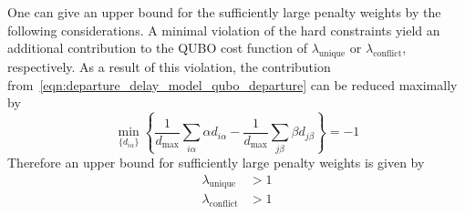 One can give an upper bound for the sufficiently large penalty weights by the following considerations.
A minimal violation of the hard constraints yield an additional contribution to the QUBO cost function of $\lambda_\text{unique}$ or $\lambda_\text{conflict}$, respectively.
As a result of this violation, the contribution from~\eqref{eqn:departure_delay_model_qubo_departure} can be reduced maximally by 
\begin{equation*}
    \min_{\{d_{i\alpha}\}} \left\{\frac{1}{d_\text{max}} \sum_{i\alpha} \alpha d_{i\alpha} - \frac{1}{d_\text{max}}\sum_{j\beta} \beta d_{j\beta} \right\} = - 1
\end{equation*}
Therefore an upper bound for sufficiently large penalty weights is given by
\begin{align*}
    \lambda_\text{unique} & > 1 \\
    \lambda_\text{conflict} &> 1
\end{align*}
